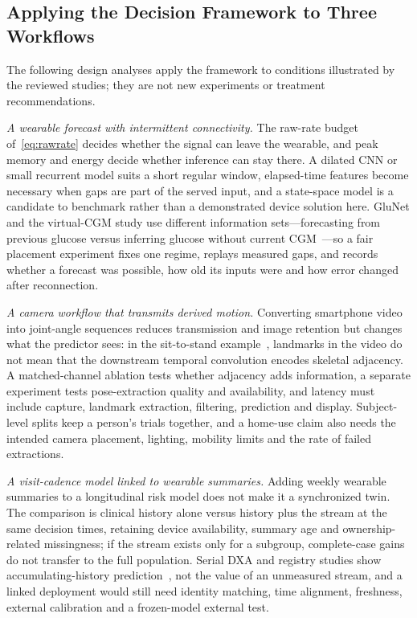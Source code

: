 \documentclass[journal]{IEEEtran}
\begin{document}
\subsection{Applying the Decision Framework to Three Workflows}
\label{sec:workedchoices}
The following design analyses apply the framework to conditions illustrated by the reviewed studies; they are not new experiments or treatment recommendations.

\emph{A wearable forecast with intermittent connectivity.} The raw-rate budget of~\eqref{eq:rawrate} decides whether the signal can leave the wearable, and peak memory and energy decide whether inference can stay there. A dilated CNN or small recurrent model suits a short regular window, elapsed-time features become necessary when gaps are part of the served input, and a state-space model is a candidate to benchmark rather than a demonstrated device solution here. GluNet and the virtual-CGM study use different information sets---forecasting from previous glucose versus inferring glucose without current CGM~\cite{Li2020GluNet,Lim2025VirtualCGM}---so a fair placement experiment fixes one regime, replays measured gaps, and records whether a forecast was possible, how old its inputs were and how error changed after reconnection.

\emph{A camera workflow that transmits derived motion.} Converting smartphone video into joint-angle sequences reduces transmission and image retention but changes what the predictor sees: in the sit-to-stand example~\cite{chan2026sitstand}, landmarks in the video do not mean that the downstream temporal convolution encodes skeletal adjacency. A matched-channel ablation tests whether adjacency adds information, a separate experiment tests pose-extraction quality and availability, and latency must include capture, landmark extraction, filtering, prediction and display. Subject-level splits keep a person's trials together, and a home-use claim also needs the intended camera placement, lighting, mobility limits and the rate of failed extractions.

\emph{A visit-cadence model linked to wearable summaries.} Adding weekly wearable summaries to a longitudinal risk model does not make it a synchronized twin. The comparison is clinical history alone versus history plus the stream at the same decision times, retaining device availability, summary age and ownership-related missingness; if the stream exists only for a subgroup, complete-case gains do not transfer to the full population. Serial DXA and registry studies show accumulating-history prediction~\cite{glaser2022deep,lin2022deep,nitski2021long}, not the value of an unmeasured stream, and a linked deployment would still need identity matching, time alignment, freshness, external calibration and a frozen-model external test.
\end{document}
